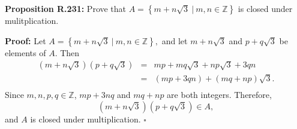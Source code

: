 \documentclass[12 pt]{article}        	%
\newcommand{\eqn}[0]{\begin{array}{rcl}}%
\newcommand{\eqnend}[0]{\end{array} }  	%
\newcommand{\qed}[0]{$\square$}        	%
\begin{document}

\textbf{Proposition R.231:}							%
Prove that $A = \left\{m + n\sqrt{3}\ |\ m,n \in \mathbb{Z} \right\}$ is closed under mulitplication.
                                   

\textbf{Proof:}              						%
Let $A = \left\{m + n\sqrt{3}\ |\ m,n \in \mathbb{Z} \right\},$ 
and let $m + n\sqrt{3}$ and $p + q\sqrt{3}$ be elements of $A$.
Then 
$$\eqn 
\left( m + n\sqrt{3} \right)\left(p + q\sqrt{3} \right) & = & mp + mq\sqrt{3} + np\sqrt{3}  + 3qn\\
																												& = & (mp + 3qn) + (mq + np)\sqrt{3}.\\    
																															  \eqnend$$
Since $m, n, p, q \in \mathbb{Z}$, $mp + 3nq$ and $ mq + np$ are both integers.  Therefore, 
$$\left( m + n\sqrt{3} \right)\left(p + q\sqrt{3}   \right) \in A,$$ 
and $A$ is closed under multiplication. \qed
\end{document}

